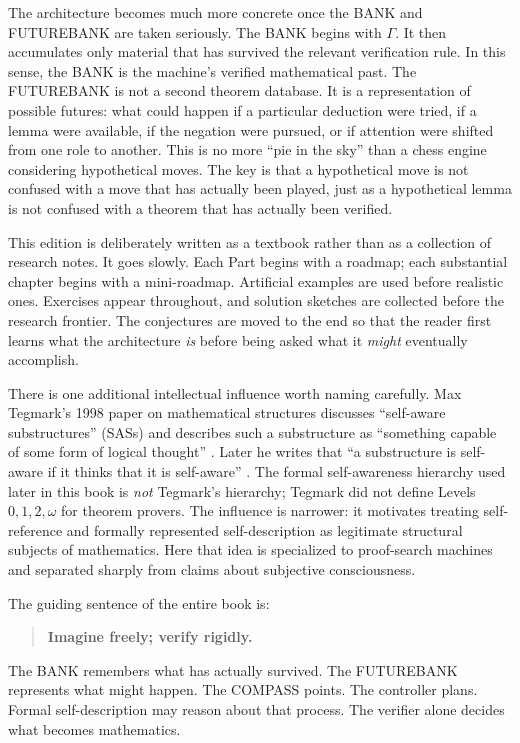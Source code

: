 \documentclass[11pt,openany]{book}
\theoremstyle{definition}
\theoremstyle{remark}
\begin{document}
The architecture becomes much more concrete once the BANK and FUTUREBANK are taken seriously. The BANK begins with $\Gamma$. It then accumulates only material that has survived the relevant verification rule. In this sense, the BANK is the machine's verified mathematical past. The FUTUREBANK is not a second theorem database. It is a representation of possible futures: what could happen if a particular deduction were tried, if a lemma were available, if the negation were pursued, or if attention were shifted from one role to another. This is no more ``pie in the sky'' than a chess engine considering hypothetical moves. The key is that a hypothetical move is not confused with a move that has actually been played, just as a hypothetical lemma is not confused with a theorem that has actually been verified.

This edition is deliberately written as a textbook rather than as a collection of research notes. It goes slowly. Each Part begins with a roadmap; each substantial chapter begins with a mini-roadmap. Artificial examples are used before realistic ones. Exercises appear throughout, and solution sketches are collected before the research frontier. The conjectures are moved to the end so that the reader first learns what the architecture \emph{is} before being asked what it \emph{might} eventually accomplish.

There is one additional intellectual influence worth naming carefully. Max Tegmark's 1998 paper on mathematical structures discusses ``self-aware substructures'' (SASs) and describes such a substructure as ``something capable of some form of logical thought'' \cite{Tegmark1998}. Later he writes that ``a substructure is self-aware if it thinks that it is self-aware'' \cite{Tegmark1998}. The formal self-awareness hierarchy used later in this book is \emph{not} Tegmark's hierarchy; Tegmark did not define Levels $0,1,2,\omega$ for theorem provers. The influence is narrower: it motivates treating self-reference and formally represented self-description as legitimate structural subjects of mathematics. Here that idea is specialized to proof-search machines and separated sharply from claims about subjective consciousness.

The guiding sentence of the entire book is:
\begin{quote}
\textbf{Imagine freely; verify rigidly.}
\end{quote}
The BANK remembers what has actually survived. The FUTUREBANK represents what might happen. The COMPASS points. The controller plans. Formal self-description may reason about that process. The verifier alone decides what becomes mathematics.
\end{document}
